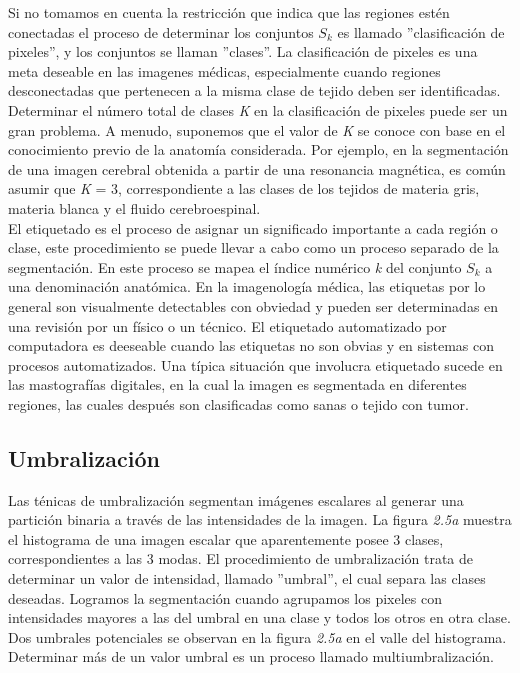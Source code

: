 \documentclass[12pt]{report}
\begin{document}
Si no tomamos en cuenta la restricción que indica que las regiones estén conectadas el proceso de determinar los conjuntos $S_{k}$ es llamado ''clasificación de pixeles'', y los conjuntos se llaman ''clases''. La clasificación de pixeles es una meta deseable en las imagenes médicas, especialmente cuando regiones desconectadas que pertenecen a la misma clase de tejido deben ser identificadas. Determinar el número total  de clases \textit{K} en la clasificación de pixeles puede ser un gran problema. A menudo, suponemos que el valor de \textit{K} se conoce con base en el conocimiento previo de la anatomía considerada. Por ejemplo, en la segmentación de una imagen cerebral obtenida a partir de una resonancia magnética, es común asumir que \textit{K} = 3, correspondiente a las clases de los tejidos de materia gris, materia blanca y el fluido cerebroespinal.\\

El etiquetado es el proceso de asignar un significado importante a cada región o clase, este procedimiento se puede llevar a cabo como un proceso separado de la segmentación. En este proceso se mapea el índice numérico \textit{k} del conjunto $S_{k}$ a una denominación anatómica. En la imagenología médica, las etiquetas por lo general son visualmente detectables con obviedad y pueden ser determinadas en una revisión por un físico o un técnico. El etiquetado automatizado por computadora es deeseable cuando las etiquetas no son obvias y en sistemas con procesos automatizados. Una típica situación que involucra etiquetado sucede en las mastografías digitales, en la cual la imagen es segmentada en diferentes regiones, las cuales después son clasificadas como sanas o tejido con tumor.\cite{metodos}

\subsection{Umbralización}
Las ténicas de umbralización segmentan imágenes escalares al generar una partición binaria a través de las intensidades de la imagen. La figura \textit{2.5a} muestra el histograma de una imagen escalar que aparentemente posee 3 clases, correspondientes a las 3 modas. El procedimiento de umbralización trata de determinar un valor de intensidad, llamado ''umbral'', el cual separa las clases deseadas. Logramos la segmentación cuando agrupamos los pixeles con intensidades mayores a las del umbral en una clase y todos los otros en otra clase. Dos umbrales potenciales se observan en la figura \textit{2.5a} en el valle del histograma. Determinar más de un valor umbral es un proceso llamado multiumbralización.\\
\end{document}
